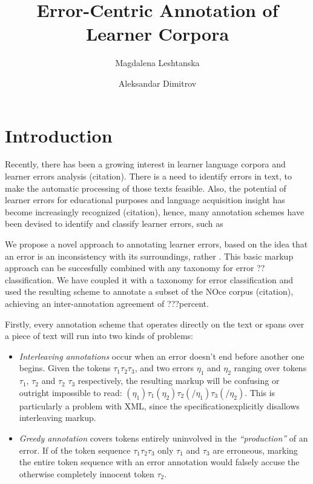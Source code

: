 \documentclass[12pt]{article}
\author{Magdalena Leshtanska \and Aleksandar Dimitrov}
\title{Error-Centric Annotation of Learner Corpora}
\begin{document}
\maketitle

\newtheorem{thm}{Theorem}[section]
\newtheorem{definition}[thm]{Definition}

\tableofcontents
{}

\section{Introduction}\label{sec:intro}

Recently, there has been a growing interest in learner language corpora and
learner errors analysis (citation). There is a need to
identify errors in text, to make the automatic processing of those texts
feasible\cite{nessel}. Also, the potential of learner errors for educational purposes and language
acquisition insight has become increasingly recognized (citation), hence, many
annotation schemes have been devised to identify and classify learner errors,
such as \cite{negthesis}

We propose a novel approach to annotating learner errors, based on the idea that
an error is an inconsistency with its surroundings, rather .  This basic markup approach can be succesfully
combined with any taxonomy for error ??classification. We have coupled it with a
taxonomy for error classification and used the resulting scheme to annotate a
subset of the NOce corpus (citation), achieving an inter-annotation agreement of
???percent.


Firstly, every annotation scheme that operates directly on the text or spans
over a piece of text will run into two kinds of problems:

\begin{itemize}
\item \textit{Interleaving annotations} occur when an error doesn't end before
another one begins. Given the tokens $\tau_1 \tau_2 \tau_3$, and two errors
$\eta_1$ and
$\eta_2$ ranging over tokens $\tau_1$, $\tau_2$ and $\tau_2$ $\tau_3$ respectively, the
resulting markup will be confusing or outright impossible to read: $(\eta_1)\tau_1
(\eta_2)\tau_2(/\eta_1)\tau_3(/\eta_2)$. This is particularly a problem with XML,
since the specification\footnotemark explicitly disallows interleaving
markup.
\item \textit{Greedy annotation} covers tokens entirely uninvolved in the
\textit{``production''} of an error. If of the token sequence $\tau_1 \tau_2
\tau_3$ only $\tau_1$
and $\tau_3$ are erroneous,
marking the entire token sequence with an error annotation would falsely accuse
the
otherwise completely innocent token $\tau_2$.
\end{itemize}
\end{document}
